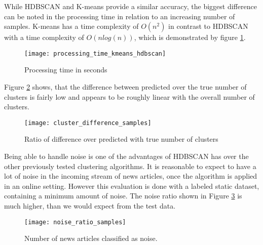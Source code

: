 While HDBSCAN and K-means provide a similar accuracy, the biggest difference can be noted in the processing time in relation to an increasing number of samples. K-means has a time complexity of $O(n^2)$ in contrast to HDBSCAN with a time complexity of $O(nlog(n))$, which is demonstrated by figure \ref{fig:processing_time_kmeans_hdbscan}.

\begin{figure}[h]
    \centering
    \texttt{[image: processing\_time\_kmeans\_hdbscan]}
    \caption{Processing time in seconds }
    \label{fig:processing_time_kmeans_hdbscan}
\end{figure}

Figure \ref{fig:cluster_difference_samples} shows, that the difference between predicted over the true number of clusters is fairly low and appears to be roughly linear with the overall number of clusters.  

\begin{figure}[h]
    \centering
    \texttt{[image: cluster\_difference\_samples]}
    \caption{Ratio of difference over predicted with true number of clusters}
    \label{fig:cluster_difference_samples}
\end{figure}

Being able to handle noise is one of the advantages of HDBSCAN has over the other previously tested clustering algorithms. It is reasonable to expect to have a lot of noise in the incoming stream of news articles, once the algorithm is applied in an online setting. However this evaluation is done with a labeled static dataset, containing a minimum amount of noise. The noise ratio shown in Figure \ref{fig:noise_ratio_samples} is much higher, than we would expect from the test data. 

\begin{figure}[h]
    \centering
    \texttt{[image: noise\_ratio\_samples]}
    \caption{Number of news articles classified as noise.}
    \label{fig:noise_ratio_samples}
\end{figure}

